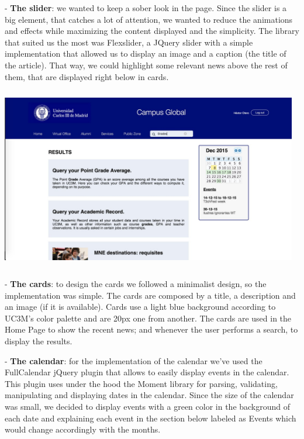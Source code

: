 \documentclass{article}
\begin{document}
	
- \textbf{The slider}: we wanted to keep a sober look in the page. Since the slider
is a big element, that catches a lot of attention, we wanted to reduce the animations
and effects while maximizing the content displayed and the simplicity. The library
that suited us the most was Flexslider, a JQuery slider with a simple implementation
that allowed us to display an image and a caption (the title of the article). That
way, we could highlight some relevant news above the rest of them, that are displayed
right below in cards.

\begin{center} 
\includegraphics[width=13cm, height=8cm, keepaspectratio]{imp_search}
\end{center} 

- \textbf{The cards}: to design the cards we followed a minimalist design, so the implementation was
simple. The cards are composed by a title, a description and an image (if
it is available). Cards use a light blue background according to UC3M's color
palette and are 20px one from another. The cards are used in the Home Page to
show the recent news; and whenever the user performs a search, to display the 
results.

- \textbf{The calendar}: for the implementation of the calendar we've used the FullCalendar jQuery plugin that allows to easily display events in the calendar. This plugin uses under the hood the Moment library for parsing, validating, manipulating and displaying dates in the calendar. Since the size of the calendar was small, we decided to display events with a green color in the background of each date and explaining each event in the section below labeled as Events which would change accordingly with the months. 
\end{document}
